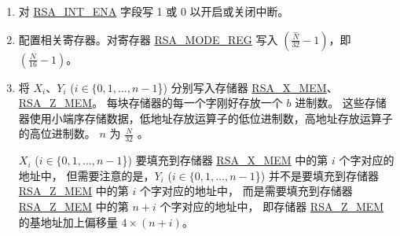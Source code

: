 \documentclass[main\_\_CN.tex]{subfiles}
\begin{document}
\begin{enumerate}

    \item 对 \hyperref[fielddesc:RSAINTENA]{RSA\_INT\_ENA} 字段写 1 或 0 以开启或关闭中断。

    \item 配置相关寄存器。对寄存器 \hyperref[regdesc:RSAMODEREG]{RSA\_MODE\_REG} 写入 \begin{math}( \frac{\hat{N}}{32} - 1 )\end{math}，即 \begin{math}(  \frac{N}{16} - 1 )\end{math}。

    \item 将 \begin{math}{X}_{i}\end{math}、\begin{math}{Y}_{i}\end{math} (\begin{math}i \in \{ 0, 1, \dots, n-1 \end{math}\}) 分别写入存储器 \hyperref[regdesc:RSAmemory]{RSA\_X\_MEM}、\hyperref[regdesc:RSAmemory]{RSA\_Z\_MEM}。
        每块存储器的每一个字刚好存放一个 \begin{math}b\end{math} 进制数。
        这些存储器使用小端序存储数据，低地址存放运算子的低位进制数，高地址存放运算子的高位进制数。
        \begin{math}n\end{math} 为 \begin{math} \frac{N}{32} \end{math} 。

         \begin{math}{X}_{i}\end{math} (\begin{math}i \in \{ 0, 1, \dots, n-1 \end{math}\}) 要填充到存储器 \hyperref[regdesc:RSAmemory]{RSA\_X\_MEM} 中的第 \begin{math}i\end{math} 个字对应的地址中，
        但需要注意的是，\begin{math}{Y}_{i}\end{math} (\begin{math}i\in\{ 0, 1, \dots, n-1 \end{math}\}) 并不是要填充到存储器 \hyperref[regdesc:RSAmemory]{RSA\_Z\_MEM} 中的第 \begin{math}i\end{math} 个字对应的地址中，
        而是需要填充到存储器 \hyperref[regdesc:RSAmemory]{RSA\_Z\_MEM} 中的第 \begin{math}n+i\end{math} 个字对应的地址中，
        即存储器 \hyperref[regdesc:RSAmemory]{RSA\_Z\_MEM} 的基地址加上偏移量 \begin{math}4 \times (n+i) \end{math}。


\end{enumerate}
\end{document}
